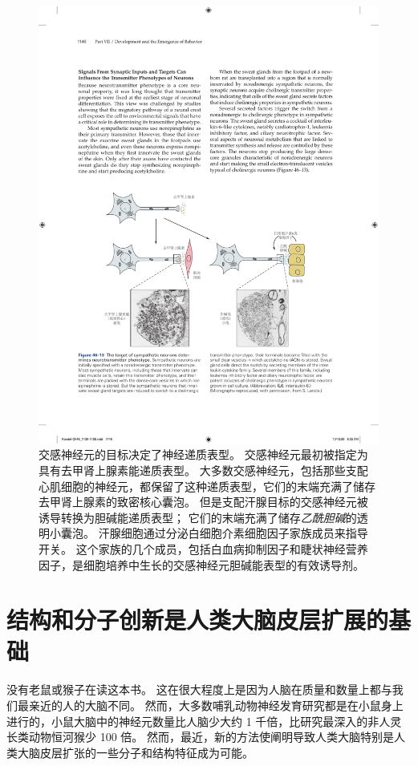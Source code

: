 \begin{figure}[htbp]
	\centering
	\includegraphics[width=1.0\linewidth]{chap46/fig_46_13}
	\caption{交感神经元的目标决定了神经递质表型。
		交感神经元最初被指定为具有去甲肾上腺素能递质表型。
		大多数交感神经元，包括那些支配心肌细胞的神经元，都保留了这种递质表型，它们的末端充满了储存去甲肾上腺素的致密核心囊泡。
		但是支配汗腺目标的交感神经元被诱导转换为胆碱能递质表型；
		它们的末端充满了储存\textit{乙酰胆碱}的透明小囊泡。
		汗腺细胞通过分泌白细胞介素细胞因子家族成员来指导开关。
		这个家族的几个成员，包括白血病抑制因子和睫状神经营养因子，是细胞培养中生长的交感神经元胆碱能表型的有效诱导剂。}
	\label{fig:46_13}
\end{figure}



\section{结构和分子创新是人类大脑皮层扩展的基础}

没有老鼠或猴子在读这本书。
这在很大程度上是因为人脑在质量和数量上都与我们最亲近的人的大脑不同。
然而，大多数哺乳动物神经发育研究都是在小鼠身上进行的，小鼠大脑中的神经元数量比人脑少大约 1 千倍，比研究最深入的非人灵长类动物恒河猴少 100 倍。
然而，最近，新的方法使阐明导致人类大脑特别是人类大脑皮层扩张的一些分子和结构特征成为可能。


